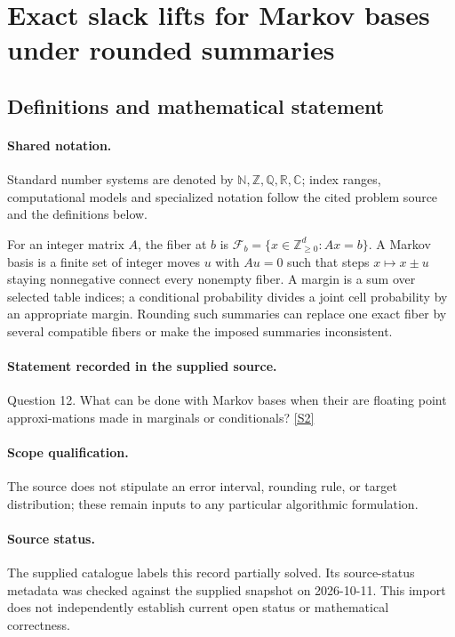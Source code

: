 \documentclass[11pt]{article}
\newcommand{\sref}[2]{\hyperlink{source:#1:#2}{[S#2]}}
\begin{document}
\section{Exact slack lifts for Markov bases under rounded summaries}\label{statement}

\subsection{Definitions and mathematical statement}

\paragraph{Shared notation.}Standard number systems are denoted by $\mathbb N,\mathbb Z,\mathbb Q,\mathbb R,\mathbb C$; index ranges, computational models and specialized notation follow the cited problem source and the definitions below.


For an integer matrix $A$, the fiber at $b$ is $\mathcal F_b=\{x\in\mathbb Z_{\ge0}^d:Ax=b\}$. A Markov basis is a finite set of integer moves $u$ with $Au=0$ such that steps $x\mapsto x\pm u$ staying nonnegative connect every nonempty fiber. A margin is a sum over selected table indices; a conditional probability divides a joint cell probability by an appropriate margin. Rounding such summaries can replace one exact fiber by several compatible fibers or make the imposed summaries inconsistent.
\paragraph{Statement recorded in the supplied source.}
Question 12. What can be done with Markov bases when their are floating point approxi-mations made in marginals or conditionals? \sref{statement}{2}
\paragraph{Scope qualification.}
The source does not stipulate an error interval, rounding rule, or target distribution; these remain inputs to any particular algorithmic formulation.
\paragraph{Source status.}
The supplied catalogue labels this record partially solved. Its source-status metadata was checked against the supplied snapshot on 2026-10-11. This import does not independently establish current open status or mathematical correctness.
\end{document}
